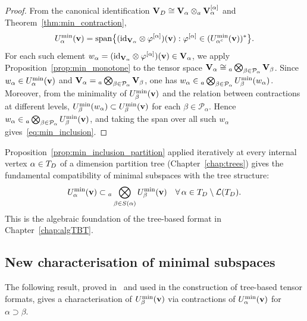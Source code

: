 \begin{proof}
From the canonical identification $\mathbf{V}_D \cong \mathbf{V}_\alpha \otimes_a
\mathbf{V}_\alpha^{[\alpha]}$ and Theorem~\ref{thm:min_contraction},
\begin{equation*}
    U^{\min}_{\alpha}(\mathbf{v}) =
    \mathrm{span}\bigl\{
        (\mathrm{id}_{\mathbf{V}_\alpha} \otimes \varphi^{[\alpha]})(\mathbf{v})
        : \varphi^{[\alpha]} \in (U^{\min}_{\alpha^c}(\mathbf{v}))^*
    \bigr\}.
\end{equation*}
For each such element $w_\alpha = (\mathrm{id}_{\mathbf{V}_\alpha} \otimes
\varphi^{[\alpha]})(\mathbf{v}) \in \mathbf{V}_\alpha$, we apply
Proposition~\ref{prop:min_monotone} to the tensor space
$\mathbf{V}_\alpha \cong {}_a\bigotimes_{\beta \in \mathcal{P}_\alpha} \mathbf{V}_\beta$.
Since $w_\alpha \in U^{\min}_{\alpha}(\mathbf{v})$ and
$\mathbf{V}_\alpha = {}_a\bigotimes_{\beta \in \mathcal{P}_\alpha} \mathbf{V}_\beta$,
one has $w_\alpha \in {}_a\bigotimes_{\beta \in \mathcal{P}_\alpha}
U^{\min}_{\beta}(w_\alpha)$. Moreover, from the minimality of
$U^{\min}_{\beta}(\mathbf{v})$ and the relation between contractions at different
levels, $U^{\min}_{\beta}(w_\alpha) \subset U^{\min}_{\beta}(\mathbf{v})$ for each
$\beta \in \mathcal{P}_\alpha$. Hence
$w_\alpha \in {}_a\bigotimes_{\beta \in \mathcal{P}_\alpha} U^{\min}_{\beta}(\mathbf{v})$,
and taking the span over all such $w_\alpha$ gives~\eqref{eq:min_inclusion}.
\end{proof}

\begin{remark}
\label{rem:min_inclusion_tree}
Proposition~\ref{prop:min_inclusion_partition} applied iteratively at
every internal vertex $\alpha \in T_D$ of a dimension partition tree
(Chapter~\ref{chap:trees}) gives the fundamental compatibility of
minimal subspaces with the tree structure:
\begin{equation}
\label{eq:min_inclusion_tree}
    U^{\min}_{\alpha}(\mathbf{v}) \subset
    {}_a\bigotimes_{\beta \in S(\alpha)} U^{\min}_{\beta}(\mathbf{v})
    \quad \forall\, \alpha \in T_D \setminus \mathcal{L}(T_D).
\end{equation}
This is the algebraic foundation of the tree-based format in
Chapter~\ref{chap:algTBT}.
\end{remark}

\subsection*{New characterisation of minimal subspaces}

The following result, proved in~\cite{FHN2021} and used in the construction
of tree-based tensor formats, gives a characterisation of $U^{\min}_{\beta}(\mathbf{v})$
via contractions of $U^{\min}_{\alpha}(\mathbf{v})$ for $\alpha \supset \beta$.

